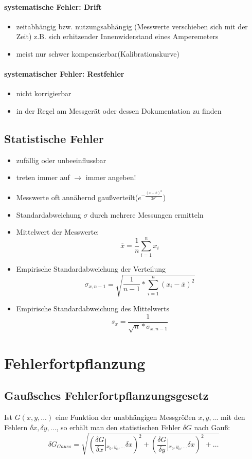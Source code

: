 \documentclass{article}
\begin{document}
	\paragraph{systematische Fehler: Drift}
	\begin{itemize}
		\item zeitabhängig bzw. nutzungsabhängig (Messwerte verschieben sich mit der Zeit)
		\subitem z.B. sich erhitzender Innenwiderstand eines Amperemeters
		\item meist nur schwer kompensierbar(Kalibrationskurve)
	\end{itemize}
	\paragraph{systematischer Fehler: Restfehler}
	\begin{itemize}
		\item nicht korrigierbar
		\item in der Regel am Messgerät oder dessen Dokumentation zu finden
	\end{itemize}
	\subsection{Statistische Fehler}
	\begin{itemize}
		\item zufällig oder unbeeinflussbar
		\item treten immer auf $\to$ immer angeben!
		\item Messwerte oft annähernd gaußverteilt($e^{-\frac{(x-\overline{x})^2}{2\sigma^2}}$)
		\item Standardabweichung $\sigma$ durch mehrere Messungen ermitteln
	\end{itemize}
	\begin{itemize}
		\item Mittelwert der Messwerte:
		\[\overline{x}=\dfrac{1}{n}\sum_{i=1}^{n}x_i\]
		\item Empirische Standardabweichung der Verteilung 
		\[\sigma_{x,n-1} =\sqrt{\dfrac{1}{n-1}\ast \sum_{i=1}^{n}(x_i-\overline{x})^2}\]
		\item Empirische Standardabweichung des Mittelwerts
		\[s_x=\dfrac{1}{\sqrt{n}\ast \sigma_{x,n-1}}\]
	\end{itemize}
	\section{Fehlerfortpflanzung}
	\subsection{Gaußsches Fehlerfortpflanzungsgesetz}
	Ist $G(x,y,...)$ eine Funktion der unabhängigen Messgrößen $x,y,...$ mit den Fehlern $\delta x,\delta y,...$, so erhält man den statistischen Fehler $\delta G$ nach Gauß:
	\[\delta G_{Gauss} = \sqrt{\left(\dfrac{\delta G}{\delta x}\left|_{x_0,y_0,\dots}\delta x\right.\right)^2 +\left(\dfrac{\delta G}{\delta y}\left|_{x_0,y_0,\dots}\delta x\right.\right)^2+\dots}\]
\end{document}
